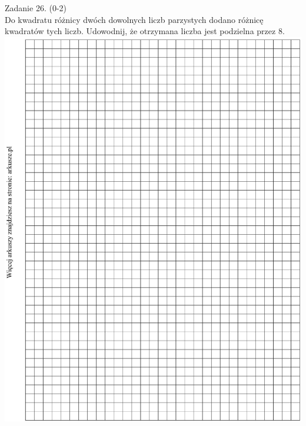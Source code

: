 \documentclass[10pt]{article}
\begin{document}
Zadanie 26. (0-2)\\
Do kwadratu różnicy dwóch dowolnych liczb parzystych dodano różnicę kwadratów tych liczb. Udowodnij, że otrzymana liczba jest podzielna przez 8.\\
\includegraphics[max width=\textwidth, center]{2024_11_21_dd21f7544b65bcf1b3c7g-12}
\end{document}
